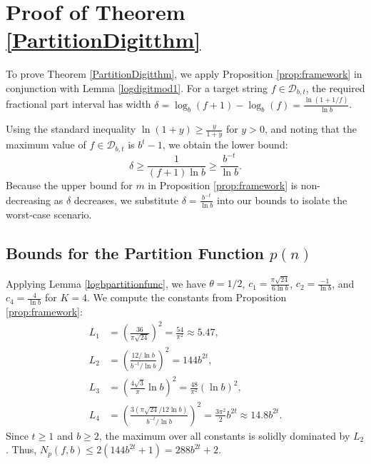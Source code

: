 \documentclass[12pt]{amsart}
\numberwithin{equation}{section}
\begin{document}
\section{Proof of Theorem \ref{PartitionDigitthm}}

To prove Theorem \ref{PartitionDigitthm}, we apply Proposition \ref{prop:framework} in conjunction with Lemma \ref{logdigitmod1}. For a target string $f \in \mathcal{D}_{b,t}$, the required fractional part interval has width $\delta = \log_b(f+1) - \log_b(f) = \frac{\ln(1+1/f)}{\ln b}$. 

Using the standard inequality $\ln(1+y) \geq \frac{y}{1+y}$ for $y > 0$, and noting that the maximum value of $f \in \mathcal{D}_{b,t}$ is $b^t - 1$, we obtain the lower bound:
\begin{equation}
\label{eq:delta_bound}
\delta \geq \frac{1}{(f+1)\ln b} \geq \frac{b^{-t}}{\ln b}.
\end{equation}
Because the upper bound for $m$ in Proposition \ref{prop:framework} is non-decreasing as $\delta$ decreases, we substitute $\delta = \frac{b^{-t}}{\ln b}$ into our bounds to isolate the worst-case scenario.

\subsection{Bounds for the Partition Function $p(n)$}
Applying Lemma \ref{logbpartitionfunc}, we have $\theta = 1/2$, $c_{1} = \frac{\pi \sqrt{24}}{6\ln b}$, $c_{2} = \frac{-1}{\ln b}$, and $c_{4} = \frac{4}{\ln b}$ for $K=4$. We compute the constants from Proposition \ref{prop:framework}:
\begin{align*}
L_{1} &= \left(\frac{36}{\pi\sqrt{24}}\right)^{2} = \frac{54}{\pi^2} \approx 5.47, \\
L_{2} &= \left(\frac{12/\ln b}{b^{-t}/\ln b}\right)^2 = 144 b^{2t}, \\
L_{3} &= \left(\frac{4 \sqrt{3}}{\pi} \ln b\right)^2 = \frac{48}{\pi^2}(\ln b)^2, \\
L_{4} &= \left(\frac{3 (\pi \sqrt{24} / 12 \ln b)}{b^{-t}/\ln b}\right)^2 = \frac{3\pi^2}{2} b^{2t} \approx 14.8 b^{2t}.
\end{align*}
Since $t \ge 1$ and $b \ge 2$, the maximum over all constants is solidly dominated by $L_2$. Thus, $N_p(f,b) \leq 2(144 b^{2t}+1) = 288 b^{2t}+2$.
\end{document}
